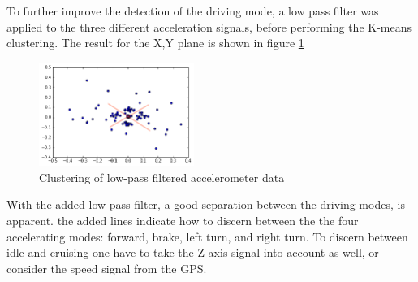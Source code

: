 To further improve the detection of the driving mode, a low pass filter was applied to the three different acceleration signals, before performing the K-means clustering. The result for the X,Y plane is shown in figure \ref{cluster2}
\begin{figure}[h]
	\centering
	\includegraphics[width=0.45\textwidth]{cluster_acc2}
  \caption{Clustering of low-pass filtered accelerometer data}
  \label{cluster2}
\end{figure}

With the added low pass filter, a good separation between the driving modes, is apparent. the added lines indicate how to discern between the the four accelerating modes: forward, brake, left turn, and right turn. To discern between idle and cruising one have to take the Z axis signal into account as well, or consider the speed signal from the GPS.  

